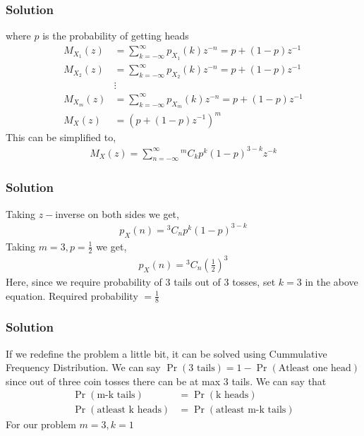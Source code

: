 \documentclass{beamer}
\providecommand{\pr}[1]{\ensuremath{\Pr\left(#1\right)}}
\providecommand{\brak}[1]{\ensuremath{\left(#1\right)}}
\theoremstyle{remark}
\numberwithin{equation}{section}
\begin{document}
      \begin{frame}
        \frametitle{Solution}
        where $p$ is the probability of getting heads
        {\small
        \begin{align}
          M_{X_1}\brak{z}&=\sum_{k=-\infty}^{\infty}p_{X_1}\brak{k}z^{-n} = p + \brak{1-p}z^{-1}\\
          M_{X_2}\brak{z}&=\sum_{k=-\infty}^{\infty}p_{X_2}\brak{k}z^{-n} = p + \brak{1-p}z^{-1}\\
          &\vdots\\
          M_{X_m}\brak{z}&=\sum_{k=-\infty}^{\infty} p_{X_m}\brak{k}z^{-n} = p + \brak{1-p}z^{-1}\\   M_X\brak{z} &= \brak{p + \brak{1-p}z^{-1}}^{m}
        \end{align}
        }
        This can be simplified to,
        {\small
        \begin{align}
          M_X\brak{z} = \sum_{n=-\infty}^{\infty}{}^mC_k p^{k}\brak{1-p}^{3-k}z^{-k}
        \end{align}
        }
      \end{frame}
      \begin{frame}[fragile]
        \frametitle{Solution}
        Taking $z-$inverse on both sides we get,
        \begin{align}
          p_X\brak{n} = {}^3C_n p^{k} \brak{1-p}^{3-k} 
        \end{align}
        Taking $m=3, p = \frac{1}{2}$ we get,
        \begin{align}
          p_X\brak{n} = {}^3C_n\brak{\frac{1}{2}}^3
        \end{align}
        Here, since we require probability of $3$ tails out of $3$ tosses, set $k=3$ in the above equation.\newline
        Required probability $=\frac{1}{8}$
      \end{frame}
      \begin{frame}[fragile]
        \frametitle{Solution}
        If we redefine the problem a little bit, it can be solved using Cummulative Frequency Distribution. We can say $\pr{\text{3 tails}} = 1 - \pr{\text{Atleast one head}}$ since out of three coin tosses there can be at max $3$ tails.\newline
        We can say that 
        \begin{align}
          \pr{\text{m-k tails}} &= \pr{\text{k heads}}\\
          \pr{\text{atleast k heads}} &= \pr{\text{atleast m-k tails}}
        \end{align}
        For our problem $m=3, k=1$      
      \end{frame}
\end{document}
